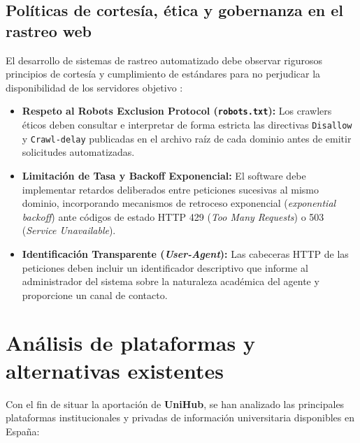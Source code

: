 \subsection{Políticas de cortesía, ética y gobernanza en el rastreo web}
El desarrollo de sistemas de rastreo automatizado debe observar rigurosos principios de cortesía y cumplimiento de estándares para no perjudicar la disponibilidad de los servidores objetivo \cite{ferrara2014web}:
\begin{itemize}
    \item \textbf{Respeto al Robots Exclusion Protocol (\texttt{robots.txt}):} Los crawlers éticos deben consultar e interpretar de forma estricta las directivas \texttt{Disallow} y \texttt{Crawl-delay} publicadas en el archivo raíz de cada dominio antes de emitir solicitudes automatizadas.
    \item \textbf{Limitación de Tasa y Backoff Exponencial:} El software debe implementar retardos deliberados entre peticiones sucesivas al mismo dominio, incorporando mecanismos de retroceso exponencial (\textit{exponential backoff}) ante códigos de estado HTTP 429 (\textit{Too Many Requests}) o 503 (\textit{Service Unavailable}).
    \item \textbf{Identificación Transparente (\textit{User-Agent}):} Las cabeceras HTTP de las peticiones deben incluir un identificador descriptivo que informe al administrador del sistema sobre la naturaleza académica del agente y proporcione un canal de contacto.
\end{itemize}

\section{Análisis de plataformas y alternativas existentes}
Con el fin de situar la aportación de \textbf{UniHub}, se han analizado las principales plataformas institucionales y privadas de información universitaria disponibles en España:


